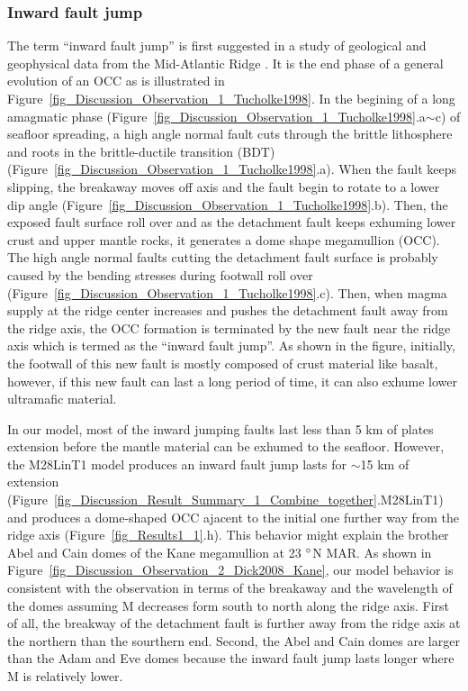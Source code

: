 \documentclass[draft,gc]{agutex}
\begin{document}
\begin{article}
\subsubsection{Inward fault jump}
The term ``inward fault jump'' is first suggested in a study of geological and geophysical data from the Mid-Atlantic Ridge \citep{Tucholke1998}. It is the end phase of a general evolution of an OCC as is illustrated in Figure~\ref{fig_Discussion_Observation_1_Tucholke1998}. In the begining of a long amagmatic phase (Figure~\ref{fig_Discussion_Observation_1_Tucholke1998}.a$\sim$c) of seafloor spreading, a high angle normal fault cuts through the brittle lithosphere and roots in the brittle-ductile transition (BDT) (Figure~\ref{fig_Discussion_Observation_1_Tucholke1998}.a). When the fault keeps slipping, the breakaway moves off axis and the fault begin to rotate to a lower dip angle (Figure~\ref{fig_Discussion_Observation_1_Tucholke1998}.b). Then, the exposed fault surface roll over and as the detachment fault keeps exhuming lower crust and upper mantle rocks, it generates a dome shape megamullion (OCC). The high angle normal faults cutting the detachment fault surface is probably caused by the bending stresses during footwall roll over (Figure~\ref{fig_Discussion_Observation_1_Tucholke1998}.c). Then, when magma supply at the ridge center increases and pushes the detachment fault away from the ridge axis, the OCC formation is terminated by the new fault near the ridge axis which is termed as the ``inward fault jump''. As shown in the figure, initially, the footwall of this new fault is mostly composed of crust material like basalt, however, if this new fault can last a long period of time, it can also exhume lower ultramafic material.

In our model, most of the inward jumping faults last less than 5 km of plates extension before the mantle material can be exhumed to the seafloor. However, the M28LinT1 model produces an inward fault jump lasts for $\sim$15 km of extension (Figure~\ref{fig_Discussion_Result_Summary_1_Combine_together}.M28LinT1) and produces a dome-shaped OCC ajacent to the initial one further way from the ridge axis (Figure~\ref{fig_Results1_1}.h). This behavior might explain the brother Abel and Cain domes of the Kane megamullion at 23 $\degree$N MAR. As shown in Figure~\ref{fig_Discussion_Observation_2_Dick2008_Kane}, our model behavior is consistent with the observation in terms of the breakaway and the wavelength of the domes assuming M decreases form south to north along the ridge axis. First of all, the breakway of the detachment fault is further away from the ridge axis at the northern than the sourthern end. Second, the Abel and Cain domes are larger than the Adam and Eve domes because the inward fault jump lasts longer where M is relatively lower.


\end{article}
\end{document}

